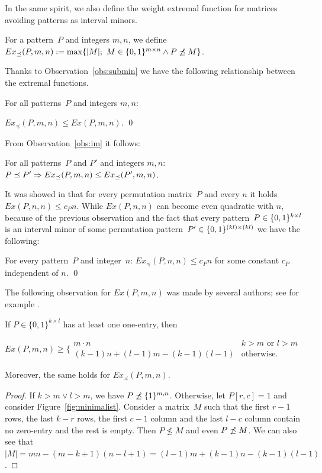 In the same spirit, we also define the weight extremal function for matrices avoiding patterns as interval minors.

\begin{defn}
For a pattern~$P$ and integers $m,n$, we define $Ex_{\preceq}(P,m,n):=\max\{|M|;\ M\in\Mat\wedge\PnimM\}$.
\end{defn}

Thanks to Observation~\ref{obs:submin} we have the following relationship between the extremal functions.

\begin{obs}
\label{obs:exm<ex}
For all patterns~$P$ and integers $m,n$:

$Ex_{\preceq}(P,m,n)\leq Ex(P,m,n)$. \qed
\end{obs}

From Observation~\ref{obs:im} it follows:

\begin{obs}
For all patterns~$P$ and $P'$ and integers $m,n$: $P\preceq P'\Rightarrow Ex_{\preceq}(P,m,n)\leq Ex_{\preceq}(P',m,n)$.
\end{obs}

It was showed in \cite{Marcus} that for every permutation matrix~$P$ and every $n$ it holds $Ex(P,n,n)\leq c_Pn$. While $Ex(P,n,n)$ can become even quadratic with $n$, because of the previous observation and the fact that every pattern~$P\in\{0,1\}^{k\times l}$ is an interval minor of some permutation pattern~$P'\in\{0,1\}^{(kl)\times(kl)}$ we have the following:

\begin{prop}
For every pattern~$P$ and integer~$n$: $Ex_{\preceq}(P,n,n)\leq c_Pn$ for some constant $c_P$ independent of $n$. \qed
\end{prop}

The following observation for $Ex(P,m,n)$ was made by several authors; see for example \cite{cibulka09, fulek}.

\begin{lemma}
If $P\in\{0,1\}^{k\times l}$ has at least one one-entry, then

$Ex(P,m,n)\geq\Big\{\begin{array}{ll}
m\cdot n & k>m\text{ or } l>m \\
(k-1)n+(l-1)m-(k-1)(l-1) & \text{otherwise.}
\end{array}$

Moreover, the same holds for $Ex_{\preceq}(P,m,n).$
\end{lemma}
\begin{proof}
If $k>m\vee l>m$, we have $P\not\preceq\{1\}^{m,n}$. Otherwise, let $P[r,c]=1$ and consider Figure~\ref{fig:minimalist}. Consider a matrix~$M$ such that the first $r-1$ rows, the last $k-r$ rows, the first $c-1$ column and the last $l-c$ column contain no zero-entry and the rest is empty. Then $P\not\leq M$ and even $P\not\preceq M$. We can also see that $|M|=mn-(m-k+1)(n-l+1)=(l-1)m+(k-1)n-(k-1)(l-1)$.
\end{proof}

